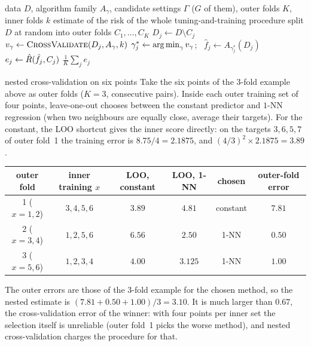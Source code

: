 \documentclass[11pt]{article}
\begin{document}
\begin{algorithm}[htbp]\small
\caption{Nested cross-validation}
\label{alg:nested}
\begin{algorithmic}[1]
\Require data $D$, algorithm family $A_\gamma$, candidate settings $\Gamma$ ($G$ of them), outer folds $K$, inner folds $k$
\Ensure estimate of the risk of the whole tuning-and-training procedure
  \State split $D$ at random into outer folds $C_1, \dots, C_K$
    \State $D_j \gets D \setminus C_j$ 
      \State $v_\gamma \gets \Call{CrossValidate}{D_j, A_\gamma, k}$ 
    \EndFor
    \State $\gamma_j^* \gets \operatorname*{arg\,min}_\gamma v_\gamma$; \ $\hat f_j \gets A_{\gamma_j^*}(D_j)$
    \State $e_j \gets \hat R(\hat f_j, C_j)$ 
  \EndFor
  \State \Return $\frac1K \sum_j e_j$ 
\EndFunction
\end{algorithmic}
\end{algorithm}

\begin{worked}{nested cross-validation on six points}
Take the six points of the 3-fold example above as outer folds ($K = 3$, consecutive pairs). Inside each outer
training set of four points, leave-one-out chooses between the constant predictor and $1$-NN regression (when two
neighbours are equally close, average their targets). For the constant, the LOO shortcut gives the inner score
directly: on the targets $3, 6, 5, 7$ of outer fold~1 the training error is $8.75/4 = 2.1875$, and $(4/3)^2 \times
2.1875 = 3.89$.
\begin{center}\small
\begin{tabular}{@{}cccccc@{}}
\toprule
outer fold & inner training $x$ & LOO, constant & LOO, 1-NN & chosen & outer-fold error \\
\midrule
1 ($x = 1, 2$) & $3, 4, 5, 6$ & $3.89$ & $4.81$ & constant & $7.81$ \\
2 ($x = 3, 4$) & $1, 2, 5, 6$ & $6.56$ & $2.50$ & 1-NN & $0.50$ \\
3 ($x = 5, 6$) & $1, 2, 3, 4$ & $4.00$ & $3.125$ & 1-NN & $1.00$ \\
\bottomrule
\end{tabular}
\end{center}
The outer errors are those of the 3-fold example for the chosen method, so the nested estimate is
$(7.81 + 0.50 + 1.00)/3 = 3.10$. It is much larger than $0.67$, the cross-validation error of the winner: with four
points per inner set the selection itself is unreliable (outer fold~1 picks the worse method), and nested
cross-validation charges the procedure for that.
\end{worked}
\end{document}
